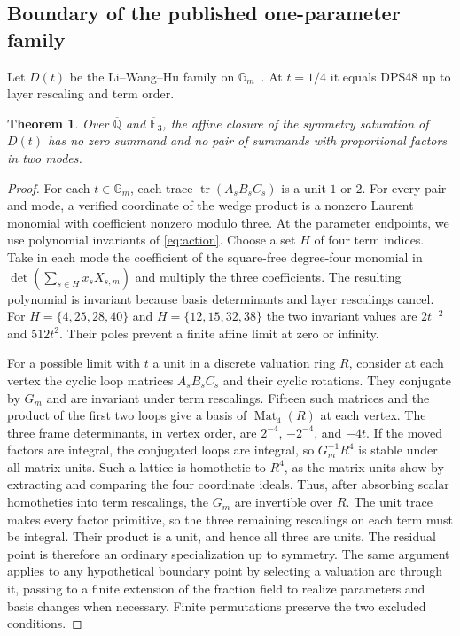 \documentclass[11pt,reqno]{amsart}
\newcommand{\F}{\mathbb F}
\newcommand{\Q}{\mathbb Q}
\newcommand{\tr}{\operatorname{tr}}
\newtheorem{theorem}{Theorem}[section]
\begin{document}
\subsection*{Boundary of the published one-parameter family}
Let \(D(t)\) be the Li--Wang--Hu family on \(\mathbb G_m\)~\cite{lwh}. At \(t=1/4\) it equals DPS48 up to layer rescaling and term order.
\begin{theorem}\label{thm:lwh}
Over \(\overline{\Q}\) and \(\overline{\F}_3\), the affine closure of the symmetry saturation of \(D(t)\) has no zero summand and no pair of summands with proportional factors in two modes.
\end{theorem}
\begin{proof}
For each \(t\in\mathbb G_m\), each trace \(\tr(A_s B_s C_s)\) is a unit \(1\) or \(2\). For every pair and mode, a verified coordinate of the wedge product is a nonzero Laurent monomial with coefficient nonzero modulo three. At the parameter endpoints, we use polynomial invariants of \eqref{eq:action}. Choose a set \(H\) of four term indices. Take in each mode the coefficient of the square-free degree-four monomial in \(\det(\sum_{s\in H}x_s X_{s,m})\) and multiply the three coefficients. The resulting polynomial is invariant because basis determinants and layer rescalings cancel. For \(H=\{4,25,28,40\}\) and \(H=\{12,15,32,38\}\) the two invariant values are \(2t^{-2}\) and \(512t^2\). Their poles prevent a finite affine limit at zero or infinity.

For a possible limit with \(t\) a unit in a discrete valuation ring \(R\), consider at each vertex the cyclic loop matrices \(A_sB_sC_s\) and their cyclic rotations. They conjugate by \(G_m\) and are invariant under term rescalings. Fifteen such matrices and the product of the first two loops give a basis of \(\operatorname{Mat}_4(R)\) at each vertex. The three frame determinants, in vertex order, are \(2^{-4}\), \(-2^{-4}\), and \(-4t\). If the moved factors are integral, the conjugated loops are integral, so \(G_m^{-1}R^4\) is stable under all matrix units. Such a lattice is homothetic to \(R^4\), as the matrix units show by extracting and comparing the four coordinate ideals. Thus, after absorbing scalar homotheties into term rescalings, the \(G_m\) are invertible over \(R\). The unit trace makes every factor primitive, so the three remaining rescalings on each term must be integral. Their product is a unit, and hence all three are units. The residual point is therefore an ordinary specialization up to symmetry. The same argument applies to any hypothetical boundary point by selecting a valuation arc through it, passing to a finite extension of the fraction field to realize parameters and basis changes when necessary. Finite permutations preserve the two excluded conditions.
\end{proof}
\end{document}
